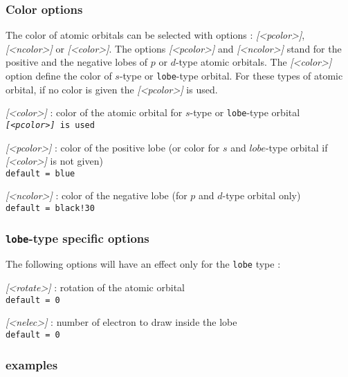 \documentclass[10pt]{article}
\newcommand*{\opt}[1]{{\ttfamily\itshape\color{green!60!black}[<#1>]}\xspace}
\begin{document}
\subsubsection*{Color options}

The color of atomic orbitals can be selected with options : \opt{pcolor}, \opt{ncolor} or \opt{color}. The options \opt{pcolor} and \opt{ncolor} stand for the positive and the negative lobes of $p$ or $d$-type atomic orbitals. The \opt{color} option define the color of $s$-type or \texttt{lobe}-type orbital. For these types of atomic orbital, if no color is given the \opt{pcolor} is used.

\begin{description}
    \item \opt{color} : color of the atomic orbital for $s$-type or \texttt{lobe}-type orbital \\
    \texttt{\opt{pcolor} is used}
    
    \item \opt{pcolor} : color of the positive lobe (or color for $s$ and $lobe$-type orbital if \opt{color} is not given)\\
    \texttt{default = blue}
    
    \item \opt{ncolor} : color of the negative lobe (for $p$ and $d$-type orbital only)\\
    \texttt{default = black!30}
\end{description}

\subsubsection*{\texttt{lobe}-type specific options}

The following options will have an effect only for the \texttt{lobe} type :

\begin{description}   
    \item \opt{rotate} : rotation of the atomic orbital\\
    \texttt{default = 0}
    
    \item \opt{nelec} : number of electron to draw inside the lobe\\
    \texttt{default = 0}
\end{description}

\subsubsection*{examples}
\end{document}
